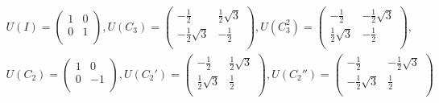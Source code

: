 \documentclass[floatfix,nofootinbib,superscriptaddress,fleqn]{revtex4}
\begin{document}
\begin{align*}
  U(I) = \begin{pmatrix}
    1&0\\
    0&1\\
  \end{pmatrix},
  U(C_3)= \begin{pmatrix}
    -\frac12&\frac12\sqrt{3}  \\
    -\frac12\sqrt{3}&-\frac12  \\
  \end{pmatrix}  ,
  U(C_3^2)= \begin{pmatrix}
    -\frac12&-\frac12\sqrt{3}  \\
    \frac12\sqrt{3}&-\frac12  \\
  \end{pmatrix} ,\\
  U(C_2)= \begin{pmatrix}
    1&0  \\
    0&-1  \\
  \end{pmatrix},
  U(C_2')= \begin{pmatrix}
    -\frac12&\frac12\sqrt{3}  \\
    \frac12\sqrt{3}&\frac12  \\
  \end{pmatrix},
  U(C_2'')= \begin{pmatrix}
    -\frac12&-\frac12\sqrt{3}  \\
    -\frac12\sqrt{3}&\frac12  \\
  \end{pmatrix}
\end{align*}
\end{document}

